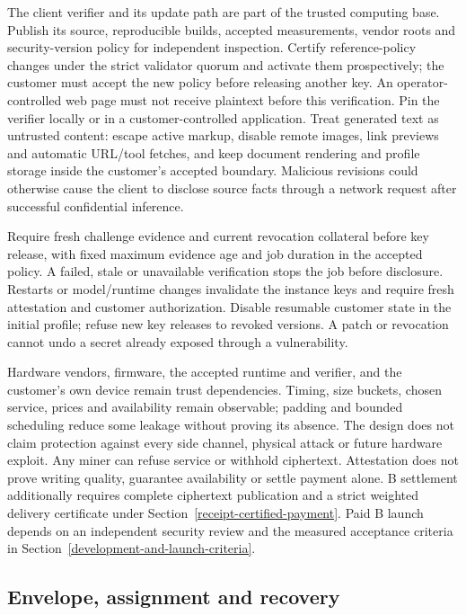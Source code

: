 The client verifier and its update path are part of the trusted computing
base. Publish its source, reproducible builds, accepted measurements,
vendor roots and security-version policy for independent inspection.
Certify reference-policy changes under the strict validator quorum and
activate them prospectively; the customer must accept the new policy
before releasing another key. An operator-controlled web page must not
receive plaintext before this verification. Pin the verifier locally or
in a customer-controlled application. Treat generated text as untrusted
content: escape active markup, disable remote images, link previews and
automatic URL/tool fetches, and keep document rendering and profile
storage inside the customer's accepted boundary. Malicious revisions
could otherwise cause the client to disclose source facts through a
network request after successful confidential inference.

Require fresh challenge evidence and current revocation collateral before
key release, with fixed maximum evidence age and job duration in the
accepted policy. A failed, stale or unavailable verification stops the
job before disclosure. Restarts or model/runtime changes invalidate the
instance keys and require fresh attestation and customer authorization.
Disable resumable customer state in the initial profile; refuse new key
releases to revoked versions. A patch or revocation cannot undo a secret
already exposed through a vulnerability.

Hardware vendors, firmware, the accepted runtime and verifier, and the
customer's own device remain trust dependencies. Timing, size buckets,
chosen service, prices and availability remain observable; padding and
bounded scheduling reduce some leakage without proving its absence.
The design does not claim protection against every side channel,
physical attack or future hardware exploit. Any miner can refuse service
or withhold ciphertext. Attestation does not prove writing quality,
guarantee availability or settle payment alone. B settlement additionally
requires complete ciphertext publication and a strict weighted delivery
certificate under Section~\ref{receipt-certified-payment}. Paid B launch
depends on an independent security review and the measured
acceptance criteria in Section~\ref{development-and-launch-criteria}.

\subsection{Envelope, assignment and recovery}\label{assigned-miner-encryption}
\label{assignment-recovery-and-the-privacy-boundary}

